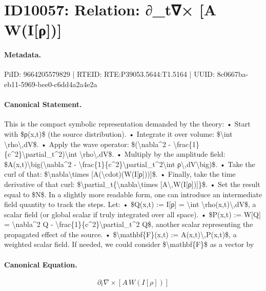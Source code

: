 \section*{ID10057: Relation: ∂\_t∇× [A W(I[ρ])]}
\paragraph{Metadata.}
PiID: 9664205579829 | RTEID: RTE:P39053.5644:T1.5164 | UUID: 8c0667ba-eb11-5969-bee0-c6dd4a2a4e2a

\paragraph{Canonical Statement.}
This is the compact symbolic representation demanded by the theory: • Start with \$ρ(x,t)\$ (the source distribution). • Integrate it over volume: \$\textbackslash{}int \textbackslash{}rho\textbackslash{},dV\$. • Apply the wave operator: \$(\textbackslash{}nabla\textasciicircum{}2 - \textbackslash{}frac\{1\}\{c\textasciicircum{}2\}\textbackslash{}partial\_t\textasciicircum{}2)\textbackslash{}int \textbackslash{}rho\textbackslash{},dV\$. • Multiply by the amplitude field: \$A(x,t)\textbackslash{}big(\textbackslash{}nabla\textasciicircum{}2 - \textbackslash{}frac\{1\}\{c\textasciicircum{}2\}\textbackslash{}partial\_t\textasciicircum{}2\textbackslash{}int ρ\textbackslash{},dV\textbackslash{}big)\$. • Take the curl of that: \$\textbackslash{}nabla\textbackslash{}times [A(\textbackslash{}cdot)(W(I[ρ]))]\$. • Finally, take the time derivative of that curl: \$\textbackslash{}partial\_t\{\textbackslash{}nabla\textbackslash{}times [A\textbackslash{},W(I[ρ])]\}\$. • Set the result equal to \$N\$. In a slightly more readable form, one can introduce an intermediate field quantity to track the steps. Let: • \$Q(x,t) := I[ρ] = \textbackslash{}int \textbackslash{}rho(x,t)\textbackslash{},dV\$, a scalar field (or global scalar if truly integrated over all space). • \$P(x,t) := W[Q] = \textbackslash{}nabla\textasciicircum{}2 Q - \textbackslash{}frac\{1\}\{c\textasciicircum{}2\}\textbackslash{}partial\_t\textasciicircum{}2 Q\$, another scalar representing the propagated effect of the source. • \$\textbackslash{}mathbf\{F\}(x,t) := A(x,t)\textbackslash{},P(x,t)\$, a weighted scalar field. If needed, we could consider \$\textbackslash{}mathbf\{F\}\$ as a vector by

\paragraph{Canonical Equation.}
\[
\partial_t{\nabla\times [A\,W(I[ρ])]}
\]

